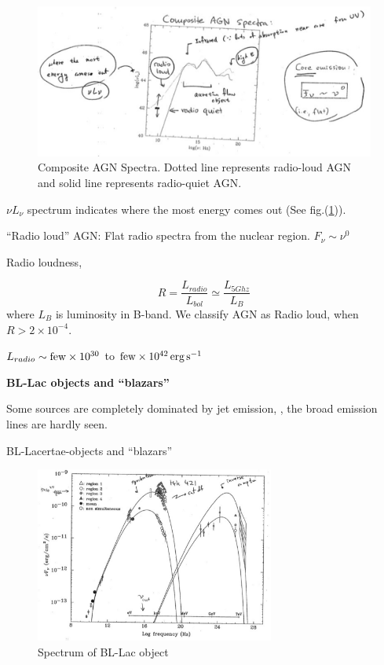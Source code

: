 \begin{enumerate}[a)]
\begin{figure}[!htbp]
   \centering
   \includegraphics[width=\textwidth]{HighEnergy/note07}
   \caption{Composite AGN Spectra. Dotted line represents radio-loud AGN and solid line represents radio-quiet AGN.}
\label{fig:AGNspectra}
\end{figure}

   $\nu L_{\nu}$ spectrum indicates where the most energy comes out (See fig.(\ref{fig:AGNspectra})).

   ``Radio loud'' AGN: Flat radio spectra from the nuclear region. $F_{\nu} \sim \nu^{0}$

   Radio loudness, 

\begin{equation}
   R = \frac{L_{radio}}{L_{bol}} \simeq \frac{L_{5Ghz}}{L_{B}}
\end{equation}
where $L_{B}$ is luminosity in B-band. We classify AGN as Radio loud, when $R > 2\times 10^{-4}$.

$L_{radio} \sim {\rm few} \times 10^{30}$ to ${\rm few} \times 10^{42}\,{\rm erg\,s^{-1}}$

\textbf{BL-Lac objects and ``blazars''}

Some sources are completely dominated by jet emission, \ie, the broad emission lines are hardly seen.

BL-Lacertae-objects and ``blazars''

\begin{figure}[!htbp]
   \centering
   \includegraphics[width=0.7\textwidth]{HighEnergy/note08}
   \caption{Spectrum of BL-Lac object}
\label{fig:BLspectrum}
\end{figure}


\end{enumerate}
